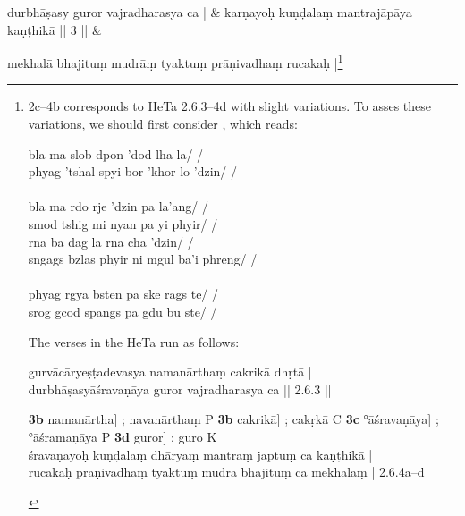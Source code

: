 \documentclass[naipra.tex]{subfiles}
\begin{document}
\begin{sanskrit}

\medskip\versequote
durbhāṣasy guror vajradharasya ca | &
karṇayoḥ kuṇḍalaṃ  mantrajāpāya kaṇṭhikā || 3 || \& 


\medskip\versequote 
mekhalā bhajituṃ mudrāṃ tyaktuṃ prāṇivadhaṃ rucakaḥ |\footnote{\begin{english}
	2c–4b corresponds to HeTa 2.6.3–4d with slight variations.
	To asses these variations, we should first consider \TIB, which reads: 

	\begin{prosequote}%
		bla ma slob dpon 'dod lha la/ /\\
		phyag 'tshal spyi bor 'khor lo 'dzin/ /\\
		\\
		bla ma rdo rje 'dzin pa la'ang/ /\\
		smod tshig mi nyan pa yi phyir/ /\\
		rna ba dag la rna cha 'dzin/ /\\
		sngags bzlas phyir ni mgul ba'i phreng/ /\\
		\\
		phyag rgya bsten pa ske rags te/ /\\
		srog gcod spangs pa gdu bu ste/ /
	\end{prosequote}

	The verses in the HeTa run as follows:

	\begin{prosequote}%
		gurvācāryeṣṭadevasya namanārthaṃ cakrikā dhṛtā |\\
		durbhāṣasyāśravaṇāya guror vajradharasya ca || 2.6.3 ||
		\medskip	

		\noindent \textbf{3b} namanārtha] ; navanārthaṃ P
		\textbf{3b} cakrikā] ; cakṛkā C
		\textbf{3c} °āśravaṇāya] ; °āśramaṇāya P
		\textbf{3d} guror] ; guro K\\

		\noindent śravaṇayoḥ kuṇḍalaṃ dhāryaṃ mantraṃ japtuṃ ca kaṇṭhikā |\\
		rucakaḥ prāṇivadhaṃ tyaktuṃ mudrā bhajituṃ ca mekhalaṃ | 2.6.4a–d
		\medskip


\end{prosequote}
\end{english}}
\end{sanskrit}
\end{document}
